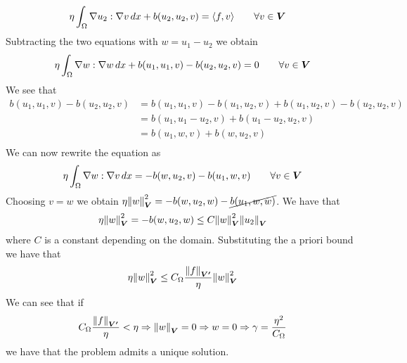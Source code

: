 \begin{enumerate}
\begin{align*}
              \eta \int_\Omega \nabla u_2 : \nabla v \, dx + b(u_2, u_2, v) & = \langle f, v \rangle \qquad \forall v \in \bm{V}
          \end{align*}
          Subtracting the two equations with \(w = u_1 - u_2\) we obtain
          \[
              \begin{split}
                  \eta \int_\Omega \nabla w : \nabla w \, dx + b(u_1, u_1, v) - b(u_2, u_2, v) = 0 \qquad \forall v \in \bm{V}
              \end{split}
          \]
          We see that
          \begin{align*}
              b(u_1, u_1, v) - b(u_2, u_2, v) & = b(u_1, u_1, v) - b(u_1, u_2, v) + b(u_1, u_2, v) - b(u_2, u_2, v) \\
                                              & = b(u_1, u_1 - u_2, v) + b(u_1 - u_2, u_2, v)                       \\
                                              & = b(u_1, w, v) + b(w, u_2, v)                                       \\
          \end{align*}
          We can now rewrite the equation as
          \[
              \begin{split}
                  \eta \int_\Omega \nabla w : \nabla v \, dx= -b(w, u_2, v) - b(u_1, w, v) \qquad \forall v \in \bm{V}
              \end{split}
          \]
          Choosing \(v = w\) we obtain \(\eta \norm{w}_{\bm{V}}^2 = -b(w, u_2, w) -
          \cancel{b(u_1, w, w)}\). We have that
          \[
              \begin{split}
                  \eta \norm{w}_{\bm{V}}^2 = -b(w, u_2, w) \leq C \norm{w}_{\bm{V}}^2 \norm{u_2}_{\bm{V}}
              \end{split}
          \]
          where \(C\) is a constant depending on the domain. Substituting the a priori
          bound we have that
          \[
              \begin{split}
                  \eta \norm{w}_{\bm{V}}^2 \leq C_\Omega \frac{\norm{f}_{\bm{V'}}}{\eta} \norm{w}_{\bm{V}}^2
              \end{split}
          \]
          We can see that if
          \[
              \begin{split}
                  C_\Omega \frac{\norm{f}_{\bm{V'}}}{\eta} < \eta \Rightarrow \norm{w}_{\bm{V}} = 0 \Rightarrow w = 0 \Rightarrow \gamma = \frac{\eta^2}{C_\Omega}
              \end{split}
          \]
          we have that the problem admits a unique solution.
\end{enumerate}

